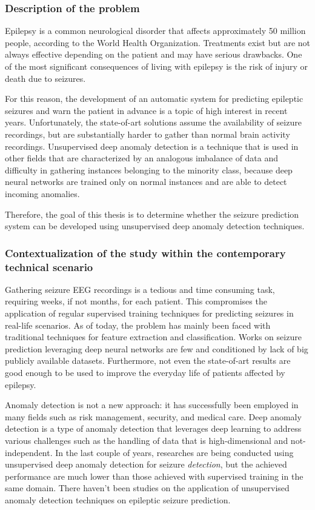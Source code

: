 \subsubsection{Description of the problem}
Epilepsy is a common neurological disorder that affects approximately 50 million people, according to the World Health Organization. Treatments exist but are not always effective depending on the patient and may have serious drawbacks. One of the most significant consequences of living with epilepsy is the risk of injury or death due to seizures.

For this reason, the development of an automatic system for predicting epileptic seizures and warn the patient in advance is a topic of high interest in recent years. Unfortunately, the state-of-art solutions assume the availability of seizure recordings, but are substantially harder to gather than normal brain activity recordings. Unsupervised deep anomaly detection is a technique that is used in other fields that are characterized by an analogous imbalance of data and difficulty in gathering instances belonging to the minority class, because deep neural networks are trained only on normal instances and are able to detect incoming anomalies. 

Therefore, the goal of this thesis is to determine whether the seizure prediction system can be developed using unsupervised deep anomaly detection techniques.


\subsubsection{Contextualization of the study within the contemporary technical scenario}
Gathering seizure EEG recordings is a tedious and time consuming task, requiring weeks, if not months, for each patient. This compromises the application of regular supervised training techniques for predicting seizures in real-life scenarios. As of today, the problem has mainly been faced with traditional techniques for feature extraction and classification. Works on seizure prediction leveraging deep neural networks are few and conditioned by lack of big publicly available datasets. Furthermore, not even the state-of-art results are good enough to be used to improve the everyday life of patients affected by epilepsy.

Anomaly detection is not a new approach: it has successfully been employed in many fields such as risk management, security, and medical care. Deep anomaly detection is a type of anomaly detection that leverages deep learning to address various challenges such as the handling of data that is high-dimensional and not-independent. 
In the last couple of years, researches are being conducted using unsupervised deep anomaly detection for seizure \textit{detection}, but the achieved performance are much lower than those achieved with supervised training in the same domain. There haven't been studies on the application of unsupervised anomaly detection techniques on epileptic seizure prediction.



